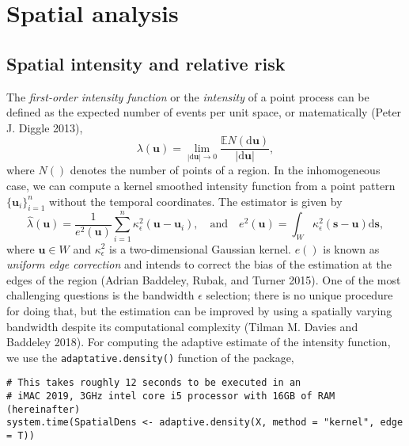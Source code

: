 \hypertarget{spatial-analysis}{%
\section{Spatial analysis}\label{spatial-analysis}}

\hypertarget{sectionintensity}{%
\subsection{Spatial intensity and relative risk}\label{sectionintensity}}

The \emph{first-order intensity function} or the \emph{intensity} of a point process can be defined as the expected number of events per unit space, or matematically (Peter J. Diggle 2013),
\[
\lambda(\mathbf{u})=\lim_{|\text{d}\mathbf{u}|\rightarrow 0}\frac{\mathbb{E}N(\text{d}\mathbf{u})}{|\text{d}\mathbf{u}|},
\]
where \(N()\) denotes the number of points of a region. In the inhomogeneous case, we can compute a kernel smoothed intensity function from a point pattern \(\{\mathbf{u}_i\}_{i=1}^n\) without the temporal coordinates. The estimator is given by
\begin{equation}
    \hat{\lambda}(\mathbf{u})=\frac{1}{e^2(\mathbf{u})}\sum_{i=1}^{n}\kappa_{\epsilon}^{2}(\mathbf{u}-\mathbf{u}_i), \quad \text{and} \quad e^2(\mathbf{u})=\int_{W} \kappa_{\epsilon}^{2}(\mathbf{s}-\mathbf{u}) \text{d} \mathbf{s},
    \label{eq:lambdaspatial}
\end{equation}
where \(\mathbf{u}\in W\) and \(\kappa_{\epsilon}^{2}\) is a two-dimensional Gaussian kernel. \(e()\) is known as \emph{uniform edge correction} and intends to correct the bias of the estimation at the edges of the region (Adrian Baddeley, Rubak, and Turner 2015). One of the most challenging questions is the bandwidth \(\epsilon\) selection; there is no unique procedure for doing that, but the estimation can be improved by using a spatially varying bandwidth despite its computational complexity (Tilman M. Davies and Baddeley 2018). For computing the adaptive estimate of the intensity function, we use the \texttt{adaptative.density()} function of the  package,

\begin{verbatim}
# This takes roughly 12 seconds to be executed in an
# iMAC 2019, 3GHz intel core i5 processor with 16GB of RAM (hereinafter)
system.time(SpatialDens <- adaptive.density(X, method = "kernel", edge = T))
\end{verbatim}

